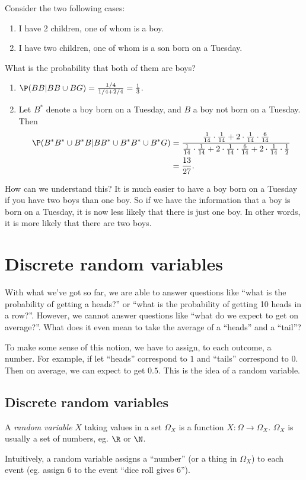 \documentclass[a4paper]{article}
\begin{document}
\begin{eg}
  Consider the two following cases:
  \begin{enumerate}
    \item I have 2 children, one of whom is a boy.
    \item I have two children, one of whom is a son born on a Tuesday.
  \end{enumerate}
  What is the probability that both of them are boys?

  \begin{enumerate}
    \item $\P(BB|BB\cup BG) = \frac{1/4}{1/4 + 2/4} = \frac{1}{3}$.
    \item Let $B^*$ denote a boy born on a Tuesday, and $B$ a boy not born on a Tuesday. Then
      \begin{align*}
        \P(B^*B^* \cup B^*B| BB^* \cup B^*B^*\cup B^*G)&=\frac{\frac{1}{14}\cdot \frac{1}{14} + 2\cdot \frac{1}{14}\cdot\frac{6}{14}}{\frac{1}{14}\cdot \frac{1}{14} + 2\cdot \frac{1}{14}\cdot\frac{6}{14} + 2\cdot \frac{1}{14}\cdot \frac{1}{2}}\\
        &= \frac{13}{27}.
      \end{align*}
  \end{enumerate}
  How can we understand this? It is much easier to have a boy born on a Tuesday if you have two boys than one boy. So if we have the information that a boy is born on a Tuesday, it is now less likely that there is just one boy. In other words, it is more likely that there are two boys.
\end{eg}

\section{Discrete random variables}
With what we've got so far, we are able to answer questions like ``what is the probability of getting a heads?'' or ``what is the probability of getting 10 heads in a row?''. However, we cannot answer questions like ``what do we expect to get on average?''. What does it even mean to take the average of a ``heads'' and a ``tail''?

To make some sense of this notion, we have to assign, to each outcome, a number. For example, if let ``heads'' correspond to $1$ and ``tails'' correspond to $0$. Then on average, we can expect to get $0.5$. This is the idea of a random variable.

\subsection{Discrete random variables}
\begin{defi}
  A \emph{random variable} $X$ taking values in a set $\Omega_X$ is a function $X: \Omega \to \Omega_X$. $\Omega_X$ is usually a set of numbers, eg. $\R$ or $\N$.
\end{defi}
Intuitively, a random variable assigns a ``number'' (or a thing in $\Omega_X$) to each event (eg. assign $6$ to the event ``dice roll gives 6'').
\end{document}
